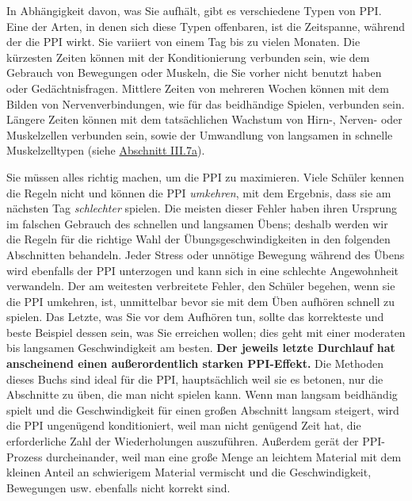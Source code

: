In Abhängigkeit davon, was Sie aufhält, gibt es verschiedene Typen von PPI.
Eine der Arten, in denen sich diese Typen offenbaren, ist die Zeitspanne, während der die PPI wirkt.
Sie variiert von einem Tag bis zu vielen Monaten.
Die kürzesten Zeiten können mit der Konditionierung verbunden sein, wie dem Gebrauch von Bewegungen oder Muskeln, die Sie vorher nicht benutzt haben oder Gedächtnisfragen.
Mittlere Zeiten von mehreren Wochen können mit dem Bilden von Nervenverbindungen, wie für das beidhändige Spielen, verbunden sein.
Längere Zeiten können mit dem tatsächlichen Wachstum von Hirn-, Nerven- oder Muskelzellen verbunden sein, sowie der Umwandlung von langsamen in schnelle Muskelzelltypen (siehe \hyperlink{c1iii7aMuskeln}{Abschnitt III.7a}).

Sie müssen alles richtig machen, um die PPI zu maximieren.
Viele Schüler kennen die Regeln nicht und können die PPI \textit{umkehren}, mit dem Ergebnis, dass sie am nächsten Tag \textit{schlechter} spielen.
Die meisten dieser Fehler haben ihren Ursprung im falschen Gebrauch des schnellen und langsamen Übens; deshalb werden wir die Regeln für die richtige Wahl der Übungsgeschwindigkeiten in den folgenden Abschnitten behandeln.
Jeder Stress oder unnötige Bewegung während des Übens wird ebenfalls der PPI unterzogen und kann sich in eine schlechte Angewohnheit verwandeln.
Der am weitesten verbreitete Fehler, den Schüler begehen, wenn sie die PPI umkehren, ist, unmittelbar bevor sie mit dem Üben aufhören schnell zu spielen.
Das Letzte, was Sie vor dem Aufhören tun, sollte das korrekteste und beste Beispiel dessen sein, was Sie erreichen wollen; dies geht mit einer moderaten bis langsamen Geschwindigkeit am besten.
\textbf{Der jeweils letzte Durchlauf hat anscheinend einen außerordentlich starken PPI-Effekt.}
Die Methoden dieses Buchs sind ideal für die PPI, hauptsächlich weil sie es betonen, nur die Abschnitte zu üben, die man nicht spielen kann.
Wenn man langsam beidhändig spielt und die Geschwindigkeit für einen großen Abschnitt langsam steigert, wird die PPI ungenügend konditioniert, weil man nicht genügend Zeit hat, die erforderliche Zahl der Wiederholungen auszuführen.
Außerdem gerät der PPI-Prozess durcheinander, weil man eine große Menge an leichtem Material mit dem kleinen Anteil an schwierigem Material vermischt und die Geschwindigkeit, Bewegungen usw. ebenfalls nicht korrekt sind.

